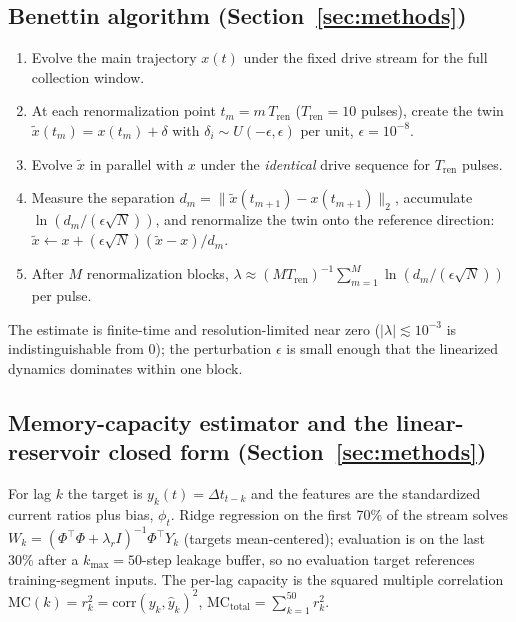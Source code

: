 \documentclass[11pt]{article}
\newcommand{\Dt}{\Delta t}
\newcommand{\MCI}{\mathrm{MC}}
\begin{document}
\subsection{Benettin algorithm (Section~\ref{sec:methods})}
\label{app:benettin}

\begin{enumerate}
\item Evolve the main trajectory $x(t)$ under the fixed drive stream for the
full collection window.
\item At each renormalization point $t_m=m\,T_{\mathrm{ren}}$
($T_{\mathrm{ren}}=10$ pulses), create the twin $\tilde{x}(t_m)=x(t_m)+\delta$
with $\delta_i\sim U(-\epsilon,\epsilon)$ per unit, $\epsilon=10^{-8}$.
\item Evolve $\tilde{x}$ in parallel with $x$ under the \emph{identical} drive
sequence for $T_{\mathrm{ren}}$ pulses.
\item Measure the separation
$d_m=\|\tilde{x}(t_{m+1})-x(t_{m+1})\|_2$, accumulate
$\ln(d_m/(\epsilon\sqrt{N}))$, and renormalize the twin onto the reference
direction: $\tilde{x}\leftarrow x+(\epsilon\sqrt{N})(\tilde{x}-x)/d_m$.
\item After $M$ renormalization blocks,
$\lambda\approx(MT_{\mathrm{ren}})^{-1}\sum_{m=1}^{M}\ln(d_m/(\epsilon
\sqrt{N}))$ per pulse.
\end{enumerate}

The estimate is finite-time and resolution-limited near zero
($|\lambda|\lesssim10^{-3}$ is indistinguishable from 0); the perturbation
$\epsilon$ is small enough that the linearized dynamics dominates within one
block.

\subsection{Memory-capacity estimator and the linear-reservoir closed form (Section~\ref{sec:methods})}
\label{app:mc}

For lag $k$ the target is $y_k(t)=\Dt_{t-k}$ and the features are the
standardized current ratios plus bias, $\phi_t$. Ridge regression on the first
70\% of the stream solves $W_k=(\Phi^\top\Phi+\lambda_r I)^{-1}\Phi^\top Y_k$
(targets mean-centered); evaluation is on the last 30\% after a
$k_{\max}=50$-step leakage buffer, so no evaluation target references
training-segment inputs. The per-lag capacity is the squared multiple
correlation $\MCI(k)=r_k^2=\mathrm{corr}(y_k,\hat{y}_k)^2$,
$\MCI_{\mathrm{total}}=\sum_{k=1}^{50}r_k^2$.
\end{document}
